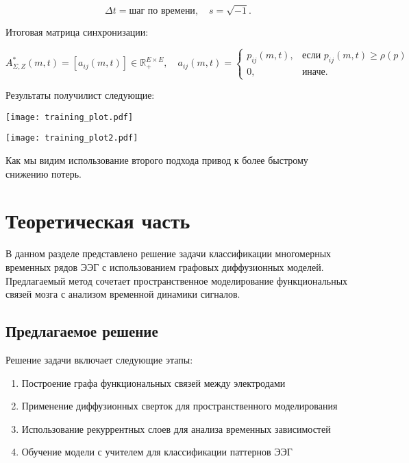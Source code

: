 \documentclass[12pt, twoside]{article}
\begin{document}
\begin{equation}
\Delta t = \text{шаг по времени}, \quad s = \sqrt{-1}.
\end{equation}

Итоговая матрица синхронизации:

\begin{equation}
A^*_{\Sigma, Z}(m, t) = [a_{ij}(m, t)] \in \mathbb{R}_+^{E \times E}, \quad a_{ij}(m, t) = 
\begin{cases} 
p_{ij}(m, t), & \text{если } p_{ij}(m, t) \geq \rho(p) \\
0, & \text{иначе}.
\end{cases}
\end{equation}


Результаты получилист следующие:


\begin{center}
\texttt{[image: training\_plot.pdf]}
\label{fig:inlineplot}
\end{center}

\begin{center}
\texttt{[image: training\_plot2.pdf]}
\label{fig:inlineplot}
\end{center}

Как мы видим использование второго подхода привод к более быстрому снижению потерь.


\section{Теоретическая часть}

В данном разделе представлено решение задачи классификации многомерных временных рядов ЭЭГ с использованием графовых диффузионных моделей. Предлагаемый метод сочетает пространственное моделирование функциональных связей мозга с анализом временной динамики сигналов.

\subsection{Предлагаемое решение}

Решение задачи включает следующие этапы:

\begin{enumerate}
    \item Построение графа функциональных связей между электродами
    \item Применение диффузионных сверток для пространственного моделирования
    \item Использование рекуррентных слоев для анализа временных зависимостей
    \item Обучение модели с учителем для классификации паттернов ЭЭГ
\end{enumerate}
\end{document}
